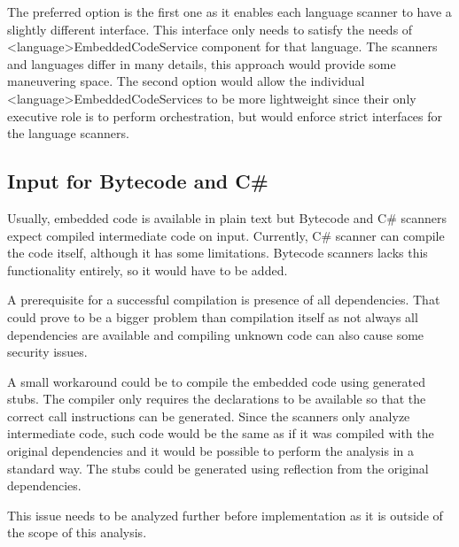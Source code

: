 The preferred option is the first one as it enables each language scanner to have a slightly different interface. This interface only needs to satisfy the needs of <language>EmbeddedCodeService component for that language. The scanners and languages differ in many details, this approach would provide some maneuvering space. The second option would allow the individual <language>EmbeddedCodeServices to be more lightweight since their only executive role is to perform orchestration, but would enforce strict interfaces for the language scanners.

\subsection{Input for Bytecode and C\#}
Usually, embedded code is available in plain text but Bytecode and C\# scanners expect compiled intermediate code on input. Currently, C\# scanner can compile the code itself, although it has some limitations. Bytecode scanners lacks this functionality entirely, so it would have to be added. 
\par
A prerequisite for a successful compilation is presence of all dependencies. That could prove to be a bigger problem than compilation itself as not always all dependencies are available and compiling unknown code can also cause some security issues.
\par
A small workaround could be to compile the embedded code using generated stubs. The compiler only requires the declarations to be available so that the correct call instructions can be generated. Since the scanners only analyze intermediate code, such code would be the same as if it was compiled with the original dependencies and it would be possible to perform the analysis in a standard way. The stubs could be generated using reflection from the original dependencies.
\par
This issue needs to be analyzed further before implementation as it is outside of the scope of this analysis.

